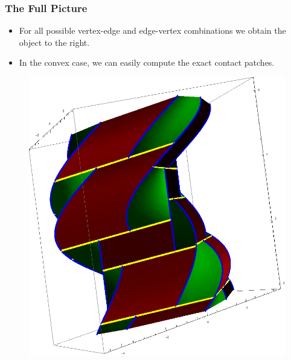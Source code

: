 \documentclass[ucs,9pt,pagenumbersfull]{beamer}
\begin{document}
\begin{frame}
  \frametitle{The Full Picture}
  \begin{minipage}[c][\textheight]{0.5\linewidth}
    \begin{itemize}
    \item<1-> For all possible vertex-edge and edge-vertex combinations we obtain the object to
      the right.
    \item<1-> In the convex case, we can easily compute the exact
      contact patches.
    \end{itemize}
  \end{minipage}
  \hfill
  \begin{minipage}[c][\textheight]{0.45\linewidth}
    \begin{figure}
      \centering
      \includegraphics[width=0.95\linewidth]{Figures/full_contact}
    \end{figure}
  \end{minipage}
\end{frame}
\end{document}
